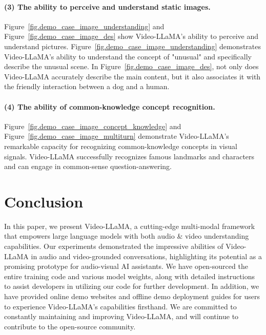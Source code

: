 \paragraph{(3) The ability to perceive and understand static images.} Figure~\ref{fig.demo_case_image_understanding} and Figure~\ref{fig.demo_case_image_des}  show Video-LLaMA's ability to perceive and understand pictures. Figure~\ref{fig.demo_case_image_understanding} demonstrates Video-LLaMA's ability to understand the concept of "unusual" and specifically describe the unusual scene.  In Figure~\ref{fig.demo_case_image_des}, not only does Video-LLaMA accurately describe the main content, but it also associates it with the friendly interaction between a dog and a human.

\paragraph{(4) The ability of common-knowledge concept recognition.} Figure~\ref{fig.demo_case_image_concept_knowledge} and Figure~\ref{fig.demo_case_image_multiturn} demonstrate Video-LLaMA's remarkable capacity for recognizing common-knowledge concepts in visual signals. Video-LLaMA successfully recognizes famous landmarks and characters and can engage in common-sense question-answering.

\section{Conclusion}
In this paper, we present Video-LLaMA, a cutting-edge multi-modal framework that empowers large language models with both audio \& video understanding capabilities. Our experiments  demonstrated the impressive abilities of Video-LLaMA in audio and video-grounded conversations, highlighting its potential as a promising prototype for audio-visual AI assistants. We have open-sourced the entire training code and various model weights, along with detailed instructions to assist developers in utilizing our code for further development. In addition, we have provided online demo websites and offline demo deployment guides for users to experience Video-LLaMA's capabilities firsthand. We are committed to constantly maintaining and improving Video-LLaMA, and will continue to contribute to the open-source community.

